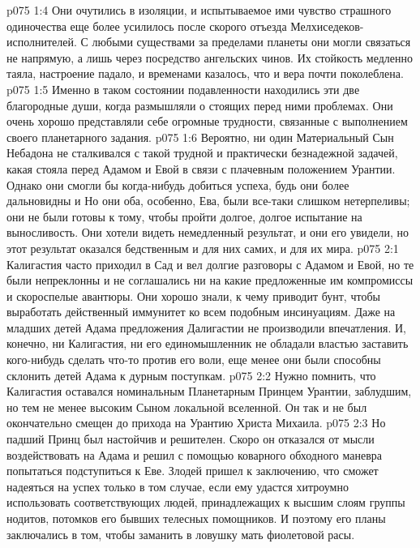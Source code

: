 \vs p075 1:4 Они очутились в изоляции, и испытываемое ими чувство страшного одиночества еще более усилилось после скорого отъезда Мелхиседеков\hyp{}исполнителей. С любыми существами за пределами планеты они могли связаться не напрямую, а лишь через посредство ангельских чинов. Их стойкость медленно таяла, настроение падало, и временами казалось, что и вера почти поколеблена.
\vs p075 1:5 Именно в таком состоянии подавленности находились эти две благородные души, когда размышляли о стоящих перед ними проблемах. Они очень хорошо представляли себе огромные трудности, связанные с выполнением своего планетарного задания.
\vs p075 1:6 Вероятно, ни один Материальный Сын Небадона не сталкивался с такой трудной и практически безнадежной задачей, какая стояла перед Адамом и Евой в связи с плачевным положением Урантии. Однако они смогли бы когда\hyp{}нибудь добиться успеха, будь они более дальновидны и  Но они оба, особенно, Ева, были все\hyp{}таки слишком нетерпеливы; они не были готовы к тому, чтобы пройти долгое, долгое испытание на выносливость. Они хотели видеть немедленный результат, и они его увидели, но этот результат оказался бедственным и для них самих, и для их мира.
\vs p075 2:1 Калигастия часто приходил в Сад и вел долгие разговоры с Адамом и Евой, но те были непреклонны и не соглашались ни на какие предложенные им компромиссы и скороспелые авантюры. Они хорошо знали, к чему приводит бунт, чтобы выработать действенный иммунитет ко всем подобным инсинуациям. Даже на младших детей Адама предложения Далигастии не производили впечатления. И, конечно, ни Калигастия, ни его единомышленник не обладали властью заставить кого\hyp{}нибудь сделать что\hyp{}то против его воли, еще менее они были способны склонить детей Адама к дурным поступкам.
\vs p075 2:2 Нужно помнить, что Калигастия оставался номинальным Планетарным Принцем Урантии, заблудшим, но тем не менее высоким Сыном локальной вселенной. Он так и не был окончательно смещен до прихода на Урантию Христа Михаила.
\vs p075 2:3 Но падший Принц был настойчив и решителен. Скоро он отказался от мысли воздействовать на Адама и решил с помощью коварного обходного маневра попытаться подступиться к Еве. Злодей пришел к заключению, что сможет надеяться на успех только в том случае, если ему удастся хитроумно использовать соответствующих людей, принадлежащих к высшим слоям группы нодитов, потомков его бывших телесных помощников. И поэтому его планы заключались в том, чтобы заманить в ловушку мать фиолетовой расы.
